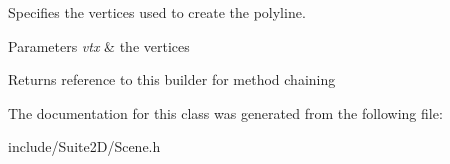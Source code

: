 Specifies the vertices used to create the polyline.


\begin{DoxyParams}{Parameters}
{\em vtx} & the vertices \\
\hline
\end{DoxyParams}
\begin{DoxyReturn}{Returns}
reference to this builder for method chaining 
\end{DoxyReturn}


The documentation for this class was generated from the following file\+:\begin{DoxyCompactItemize}
\item 
include/\+Suite2\+D/Scene.\+h\end{DoxyCompactItemize}
